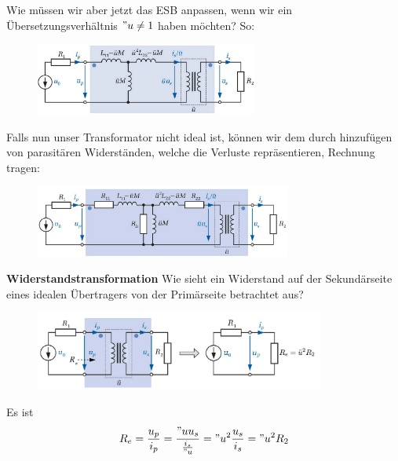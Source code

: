 Wie müssen wir aber jetzt das ESB anpassen, wenn wir ein Übersetzungsverhältnis $"u \neq 1$ haben möchten? So:
\begin{figure}[H]
	\center
	\includegraphics[width=0.65\textwidth]{img/Tra8}
	\vspace{-0.2cm}
\end{figure}
Falls nun unser Transformator nicht ideal ist, können wir dem durch hinzufügen von parasitären Widerständen, welche die Verluste repräsentieren, Rechnung tragen:
\begin{figure}[H]
	\center
	\includegraphics[width=0.75\textwidth]{img/Tra9}
	\vspace{-0.2cm}
\end{figure}

\textbf{Widerstandstransformation}\newline
Wie sieht ein Widerstand auf der Sekundärseite eines idealen Übertragers von der Primärseite betrachtet aus?
\begin{figure}[H]
	\center
	\includegraphics[width=0.85\textwidth]{img/Tra10}
	\vspace{-0.2cm}
\end{figure}
Es ist
$$R_e = \frac{u_p}{i_p} = \frac{"u u_s}{\frac{i_s}{"u}}="u^2\frac{u_s}{i_s} = "u^2R_2$$
\pagebreak
